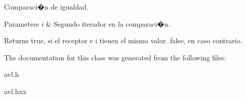 Comparaci�n de igualdad. 


\begin{DoxyParams}{Parameters}
{\em i} & Segundo iterador en la comparaci�n. \\
\hline
\end{DoxyParams}
\begin{DoxyReturn}{Returns}
true, si el receptor e i tienen el mismo valor. false, en caso contrario. 
\end{DoxyReturn}


The documentation for this class was generated from the following files\-:\begin{DoxyCompactItemize}
\item 
avl.\-h\item 
avl.\-hxx\end{DoxyCompactItemize}
